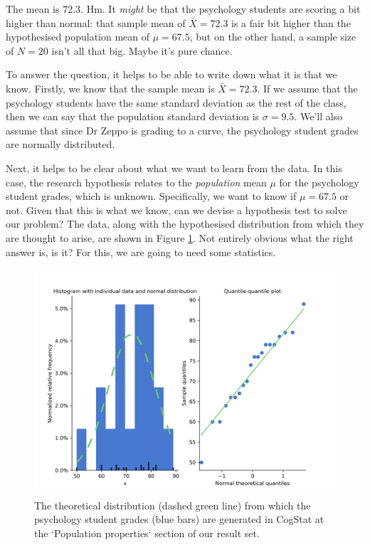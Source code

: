 \documentclass[
  11pt,
  a4paper,
  twoside,symmetric,openright]{book}
\theoremstyle{break}
\theoremstyle{break}
\begin{document}
The mean is \(72.3\). Hm. It \emph{might} be that the psychology students are scoring a bit higher than normal: that sample mean of \(\bar{X} = 72.3\) is a fair bit higher than the hypothesised population mean of \(\mu = 67.5\), but on the other hand, a sample size of \(N = 20\) isn't all that big. Maybe it's pure chance.

To answer the question, it helps to be able to write down what it is that we know. Firstly, we know that the sample mean is \(\bar{X} = 72.3\). If we assume that the psychology students have the same standard deviation as the rest of the class, then we can say that the population standard deviation is \(\sigma = 9.5\). We'll also assume that since Dr Zeppo is grading to a curve, the psychology student grades are normally distributed.

Next, it helps to be clear about what we want to learn from the data. In this case, the research hypothesis relates to the \emph{population} mean \(\mu\) for the psychology student grades, which is unknown. Specifically, we want to know if \(\mu = 67.5\) or not. Given that this is what we know, can we devise a hypothesis test to solve our problem? The data, along with the hypothesised distribution from which they are thought to arise, are shown in Figure \ref{fig:zeppo}. Not entirely obvious what the right answer is, is it? For this, we are going to need some statistics.

\begin{figure}

{\centering \includegraphics[width=0.6\linewidth]{resources/image/zeppohist} 

}

\caption{The theoretical distribution (dashed green line) from which the psychology student grades (blue bars) are generated in CogStat at the `Population properties` section of our result set.}\label{fig:zeppo}
\end{figure}
\end{document}
